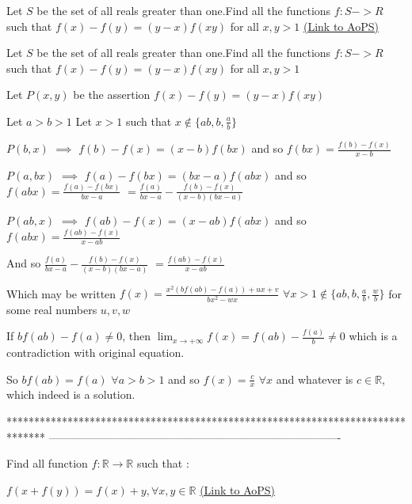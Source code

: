 \begin{problem}
	Let $S$ be the set of all reals greater than one.Find all the functions $ f:S->R$ such that $ f(x)-f(y)=(y-x)f(xy)$ for all $x,y>1$
	\flushright \href{https://artofproblemsolving.com/community/c6h559052}{(Link to AoPS)}
\end{problem}



\begin{solution}
	\begin{tcolorbox}Let $S$ be the set of all reals greater than one.Find all the functions $ f:S->R$ such that $ f(x)-f(y)=(y-x)f(xy)$ for all $x,y>1$\end{tcolorbox}
Let $P(x,y)$ be the assertion $f(x)-f(y)=(y-x)f(xy)$

Let $a>b>1$
Let $x>1$ such that $x\notin\{ab,b,\frac ab\}$

$P(b,x)$ $\implies$ $f(b)-f(x)=(x-b)f(bx)$ and so $f(bx)=\frac{f(b)-f(x)}{x-b}$

$P(a,bx)$ $\implies$ $f(a)-f(bx)=(bx-a)f(abx)$ and so $f(abx)=\frac{f(a)-f(bx)}{bx-a}$ $=\frac{f(a)}{bx-a}-\frac{f(b)-f(x)}{(x-b)(bx-a)}$

$P(ab,x)$ $\implies$ $f(ab)-f(x)=(x-ab)f(abx)$ and so $f(abx)=\frac{f(ab)-f(x)}{x-ab}$

And so $\frac{f(a)}{bx-a}-\frac{f(b)-f(x)}{(x-b)(bx-a)}$ $=\frac{f(ab)-f(x)}{x-ab}$

Which may be written $f(x)=\frac{x^2(bf(ab)-f(a))+ux+v}{bx^2-wx}$ $\forall x>1\notin\{ab,b,\frac ab,\frac wb\}$ for some real numbers $u,v,w$

If $bf(ab)-f(a)\ne 0$, then $\lim_{x\to+\infty}f(x)=f(ab)-\frac{f(a)}b\ne 0$ which is a contradiction with original equation.

So $bf(ab)=f(a)$ $\forall a>b>1$ and so $\boxed{f(x)=\frac cx}$ $\forall x$ and whatever is $c\in\mathbb R$, which indeed is a solution.
\end{solution}
*******************************************************************************
-------------------------------------------------------------------------------

\begin{problem}
	Find all function $f:\mathbb{R} \to \mathbb{R}$ such that : 

$f(x+f(y))=f(x)+y , \forall x,y \in \mathbb{R}$
	\flushright \href{https://artofproblemsolving.com/community/c6h559211}{(Link to AoPS)}
\end{problem}



